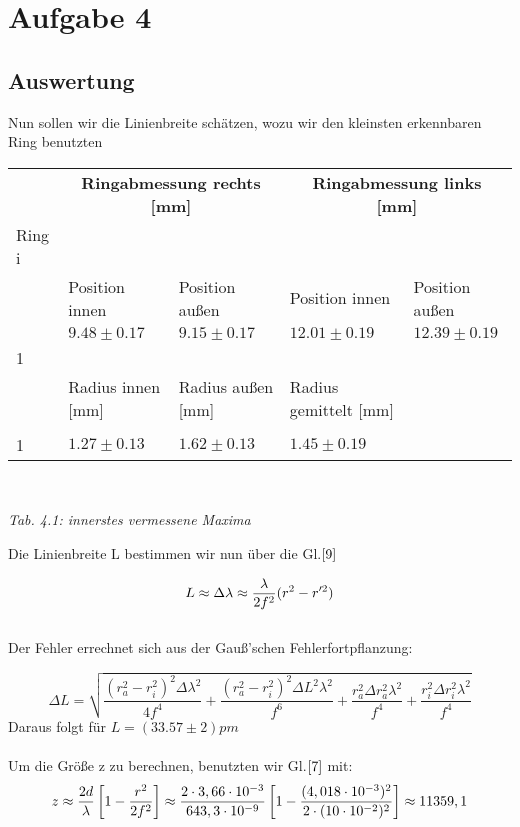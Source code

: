 \section{Aufgabe 4}
\subsection{Auswertung}
Nun sollen wir die Linienbreite schätzen, wozu wir den kleinsten erkennbaren Ring benutzten 
\\

\begin{tabular}{l|l|l|l|l}
 & \multicolumn{2}{c|}{\textbf{Ringabmessung rechts [mm]}} & \multicolumn{2}{c}{\textbf{Ringabmessung links [mm]}} \\
Ring i & & & & \\
		& Position innen & Position außen & Position innen & Position außen\\	
\hline
 & $9.48\pm 0.17$ & $9.15\pm 0.17$ & $12.01\pm 0.19$ & $12.39\pm 0.19$ \\
1 & & & & \\
& Radius innen [mm] & Radius außen [mm] & Radius gemittelt [mm] &\\ \hline
& & &  \\
1 & $1.27\pm 0.13$ & $1.62\pm 0.13$ & $1.45\pm 0.19$\\
\end{tabular}\\
\begin{center}
\it Tab. 4.1: innerstes vermessene Maxima\\
\end{center}

Die Linienbreite L bestimmen wir nun über die Gl.$\eqref{9}$

\begin{equation}\notag
L\approx \Delta \lambda \approx \frac {\lambda}{2f^2} (r^2 - r'^2)
\end{equation}\\
Der Fehler errechnet sich aus der Gauß'schen Fehlerfortpflanzung:

\begin{equation}
\Delta L=\sqrt{\frac{(r_{a}^2-r_{i}^2)^2\Delta \lambda^2}{4f^4}+\frac{(r_{a}^2-r_{i}^2)^2\Delta L^2\lambda^2}{f^6}+\frac{r_{a}^2\Delta r_{a}^2\lambda^2}{f^4}+\frac{r_{i}^2\Delta r_{i}^2\lambda^2}{f^4}}
\end{equation}
Daraus folgt für $L=(33.57\pm 2)pm$\\
\\
Um die Größe z zu berechnen, benutzten wir Gl.\(\eqref{7}\) mit:
\begin{equation}\notag
z\approx \frac{2d}{\lambda}\left[1-\frac{r^2}{2f^2}\right]\approx \frac{2\cdot 3,66\cdot 10^{-3}}{643,3\cdot 10^{-9}}\left[1-\frac{(4,018\cdot 10^{-3})^2}{2\cdot (10\cdot10^{-2})^2}\right]\approx 11359,1
\end{equation}

